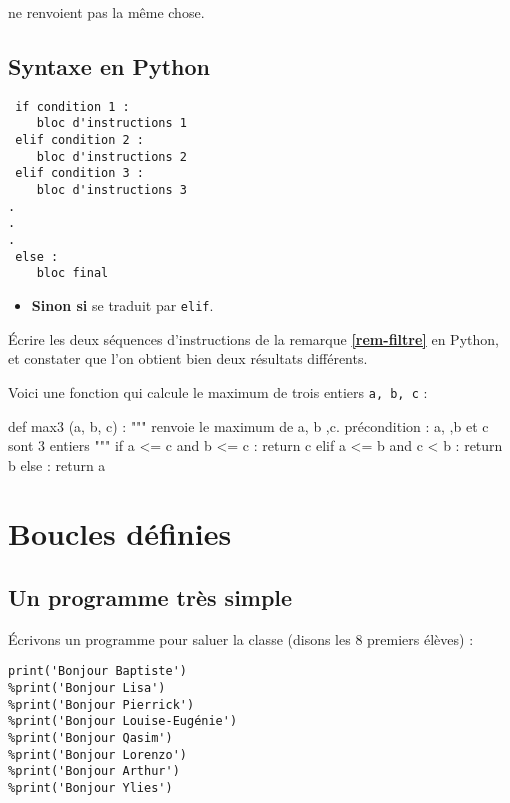 \begin{rem}
\begin{itemize}
ne renvoient pas la même chose.

\end{itemize}
\end{rem}

\subsection{Syntaxe en Python}

\begin{lstlisting}
 if condition 1 :
	bloc d'instructions 1
 elif condition 2 :
	bloc d'instructions 2
 elif condition 3 :
	bloc d'instructions 3
.
.
.
 else :
	bloc final
\end{lstlisting}

\begin{itemize}
 \item \textbf{Sinon si} se traduit par \texttt{elif}. 
\end{itemize}

Écrire les deux séquences d'instructions de la remarque \textbf{\ref{rem-filtre}} en Python, et 
constater que l'on obtient bien deux résultats différents.

Voici une fonction qui calcule le maximum de trois entiers \texttt{a, b, c} :
\begin{pyverbatim}
def max3 (a, b, c) :
    """ renvoie le maximum de a, b ,c.
    précondition : a, ,b et c sont 3 entiers """
    if a <= c and b <= c :
        return c
    elif a <= b and c < b :
        return b
    else :
        return a
\end{pyverbatim}



\section{Boucles définies}

\subsection{Un programme très simple}

Écrivons un programme pour saluer la classe (disons les 8 premiers
élèves) :
\begin{lstlisting}
print('Bonjour Baptiste')
%print('Bonjour Lisa')
%print('Bonjour Pierrick')
%print('Bonjour Louise-Eugénie')
%print('Bonjour Qasim')
%print('Bonjour Lorenzo')
%print('Bonjour Arthur')
%print('Bonjour Ylies')
\end{lstlisting}

